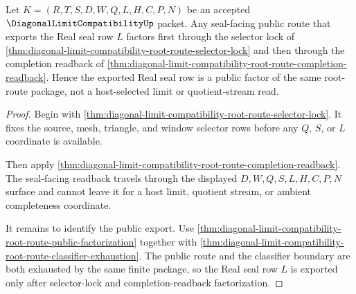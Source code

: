 \begin{theorem}
\label{thm:diagonal-limit-compatibility-root-route-seal-factorization}
Let $K=(R,T,S,D,W,Q,L,H,C,P,N)$ be an accepted $\DiagonalLimitCompatibilityUp$ packet. Any seal-facing public route that exports the Real seal row $L$ factors first through the selector lock of \autoref{thm:diagonal-limit-compatibility-root-route-selector-lock} and then through the completion readback of \autoref{thm:diagonal-limit-compatibility-root-route-completion-readback}. Hence the exported Real seal row is a public factor of the same root-route package, not a host-selected limit or quotient-stream read.
\end{theorem}
\begin{proof}
Begin with \autoref{thm:diagonal-limit-compatibility-root-route-selector-lock}. It fixes the source, mesh, triangle, and window selector rows before any $Q$, $S$, or $L$ coordinate is available.

Then apply \autoref{thm:diagonal-limit-compatibility-root-route-completion-readback}. The seal-facing readback travels through the displayed $D,W,Q,S,L,H,C,P,N$ surface and cannot leave it for a host limit, quotient stream, or ambient completeness coordinate.

It remains to identify the public export. Use \autoref{thm:diagonal-limit-compatibility-root-route-public-factorization} together with \autoref{thm:diagonal-limit-compatibility-root-route-classifier-exhaustion}. The public route and the classifier boundary are both exhausted by the same finite package, so the Real seal row $L$ is exported only after selector-lock and completion-readback factorization.
\end{proof}

